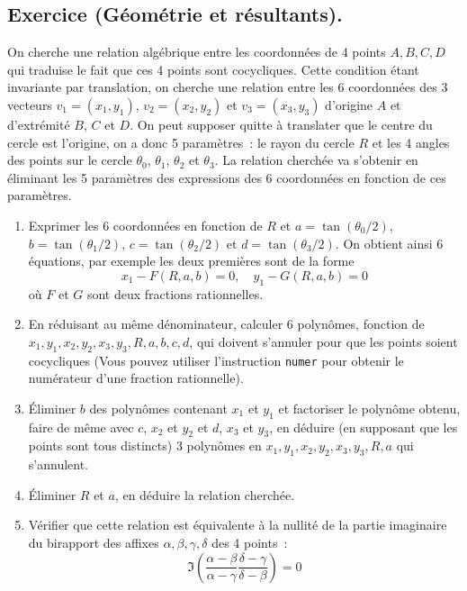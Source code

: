 \documentclass[a4paper,11pt]{article}
\begin{document}
\subsection{Exercice (G\'eom\'etrie et r\'esultants).}
On cherche une relation alg\'ebrique entre les coordonn\'ees de 4 points
$A,B,C,D$ qui traduise le fait que ces 4 points sont cocycliques. Cette
condition \'etant invariante par translation, on cherche une
relation entre les 6 coordonn\'ees des 3 vecteurs $v_1=(x_1,y_1)$, 
$v_2=(x_2,y_2)$ et $v_3=(x_3,y_3)$ 
d'origine $A$ et d'extr\'emit\'e $B$, $C$ et $D$.
On peut supposer quitte \`a translater que le centre du cercle est
l'origine, on a donc 5 param\`etres~: le rayon du cercle $R$ et les
4 angles des points sur le cercle $\theta_0$, $\theta_1$, $\theta_2$ et
$\theta_3$. La relation cherch\'ee va s'obtenir en \'eliminant les
5 param\`etres des expressions des 6 coordonn\'ees en fonction de
ces param\`etres.
\begin{enumerate}
\item Exprimer les 6 coordonn\'ees en fonction de 
$R$ et $a=\tan(\theta_0/2)$, $b=\tan(\theta_1/2)$, $c=\tan(\theta_2/2)$
et $d=\tan(\theta_3/2)$. On obtient ainsi 6 \'equations, par exemple les
deux premi\`eres sont de la forme
\[ x_1- F(R,a,b)= 0, \quad y_1- G(R,a,b)= 0 \]
o\`u $F$ et $G$ sont deux fractions rationnelles.
\item En r\'eduisant au m\^eme d\'enominateur, calculer 6 
polyn\^omes, fonction de
$x_1,y_1,x_2,y_2,x_3,y_3,R,a,b,c,d$, qui doivent s'annuler
pour que les points soient cocycliques
(Vous pouvez utiliser l'instruction \verb|numer| pour obtenir le
num\'erateur d'une fraction rationnelle).
\item \'Eliminer $b$ des polyn\^omes
contenant $x_1$ et $y_1$ et factoriser
le polyn\^ome obtenu, faire de m\^eme avec $c$, $x_2$ et $y_2$
et $d$, $x_3$ et $y_3$, en d\'eduire (en supposant que les points sont
tous distincts) 3 polyn\^omes en $x_1,y_1,x_2,y_2,x_3,y_3,R,a$ qui
s'annulent.
\item \'Eliminer $R$ et $a$, en d\'eduire la relation cherch\'ee.
\item V\'erifier que cette relation est \'equivalente \`a la nullit\'e
de la partie imaginaire du birapport des affixes $\alpha, \beta, \gamma,
\delta$ des 4 points~:
\[ \Im \left( \frac{\alpha-\beta}{\alpha-\gamma}
\frac{\delta-\gamma}{\delta-\beta} \right) = 0\]
\end{enumerate}
\end{document}
